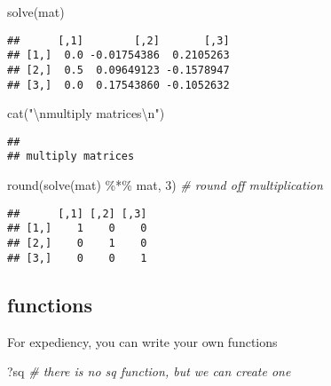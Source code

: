 \documentclass[
]{article}
\newenvironment{Shaded}{\begin{snugshade}}{\end{snugshade}}
\newcommand{\CommentTok}[1]{\textcolor[rgb]{0.56,0.35,0.01}{\textit{#1}}}
\newcommand{\DecValTok}[1]{\textcolor[rgb]{0.00,0.00,0.81}{#1}}
\newcommand{\FunctionTok}[1]{\textcolor[rgb]{0.00,0.00,0.00}{#1}}
\newcommand{\NormalTok}[1]{#1}
\newcommand{\SpecialCharTok}[1]{\textcolor[rgb]{0.00,0.00,0.00}{#1}}
\newcommand{\StringTok}[1]{\textcolor[rgb]{0.31,0.60,0.02}{#1}}
\begin{document}
\begin{Shaded}
\begin{Highlighting}[]
\FunctionTok{solve}\NormalTok{(mat) }
\end{Highlighting}
\end{Shaded}

\begin{verbatim}
##      [,1]        [,2]       [,3]
## [1,]  0.0 -0.01754386  0.2105263
## [2,]  0.5  0.09649123 -0.1578947
## [3,]  0.0  0.17543860 -0.1052632
\end{verbatim}

\begin{Shaded}
\begin{Highlighting}[]
\FunctionTok{cat}\NormalTok{(}\StringTok{"}\SpecialCharTok{\textbackslash{}n}\StringTok{multiply matrices}\SpecialCharTok{\textbackslash{}n}\StringTok{"}\NormalTok{)}
\end{Highlighting}
\end{Shaded}

\begin{verbatim}
## 
## multiply matrices
\end{verbatim}

\begin{Shaded}
\begin{Highlighting}[]
\FunctionTok{round}\NormalTok{(}\FunctionTok{solve}\NormalTok{(mat) }\SpecialCharTok{\%*\%}\NormalTok{ mat, }\DecValTok{3}\NormalTok{)  }\CommentTok{\# round off multiplication}
\end{Highlighting}
\end{Shaded}

\begin{verbatim}
##      [,1] [,2] [,3]
## [1,]    1    0    0
## [2,]    0    1    0
## [3,]    0    0    1
\end{verbatim}

\hypertarget{functions}{%
\subsection{functions}\label{functions}}

For expediency, you can write your own functions

\begin{Shaded}
\begin{Highlighting}[]
\NormalTok{?sq   }\CommentTok{\# there is no sq function, but we can create one}
\end{Highlighting}
\end{Shaded}
\end{document}

